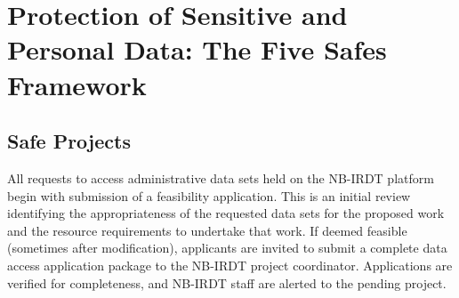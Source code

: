 \hypertarget{nbirdt-fivesafes}{%
\section{Protection of Sensitive and Personal Data: The Five Safes Framework}\label{nbirdt-fivesafes}}

\hypertarget{nbirdt-safeproject}{%
\subsection{Safe Projects}\label{nbirdt-safeproject}}

All requests to access administrative data sets held on the NB-IRDT platform begin with submission of a feasibility application. This is an initial review identifying the appropriateness of the requested data sets for the proposed work and the resource requirements to undertake that work. If deemed feasible (sometimes after modification), applicants are invited to submit a complete data access application package to the NB-IRDT project coordinator. Applications are verified for completeness, and NB-IRDT staff are alerted to the pending project.

